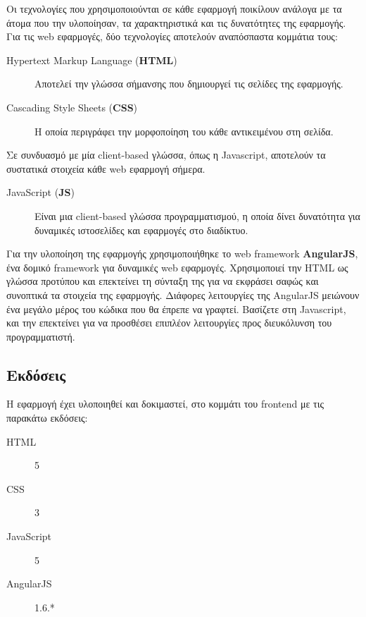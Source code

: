 Οι τεχνολογίες που χρησιμοποιούνται σε κάθε εφαρμογή ποικίλουν ανάλογα με τα άτομα που την υλοποίησαν, τα χαρακτηριστικά και τις δυνατότητες της εφαρμογής.
\newline
Για τις web εφαρμογές, δύο τεχνολογίες αποτελούν αναπόσπαστα κομμάτια τους:

\begin{description}
\item [Hypertext Markup Language (\textbf{HTML})] Αποτελεί την γλώσσα σήμανσης που δημιουργεί τις σελίδες της εφαρμογής.

\item [Cascading Style Sheets (\textbf{CSS})] Η οποία περιγράφει την μορφοποίηση του κάθε αντικειμένου στη σελίδα. 
\end{description}


Σε συνδυασμό με μία client-based γλώσσα, όπως η Javascript, αποτελούν τα συστατικά στοιχεία κάθε web εφαρμογή σήμερα.

\begin{description}
\item [JavaScript (\textbf{JS})] Είναι μια client-based γλώσσα προγραμματισμού, η οποία δίνει δυνατότητα για δυναμικές ιστοσελίδες και εφαρμογές στο διαδίκτυο.
\end{description}

Για την υλοποίηση της εφαρμογής χρησιμοποιήθηκε το web framework \textbf{AngularJS}, ένα δομικό framework για δυναμικές web εφαρμογές. Χρησιμοποιεί την HTML ως γλώσσα προτύπου και επεκτείνει τη σύνταξη της για να εκφράσει σαφώς και συνοπτικά τα στοιχεία της εφαρμογής. Διάφορες  λειτουργίες της AngularJS μειώνουν ένα μεγάλο μέρος του κώδικα που θα έπρεπε να γραφτεί. Βασίζετε στη Javascript, και την επεκτείνει για να προσθέσει επιπλέον λειτουργίες προς διευκόλυνση του προγραμματιστή.

\subsection{Εκδόσεις}

Η εφαρμογή έχει υλοποιηθεί και δοκιμαστεί, στο κομμάτι του frontend με τις παρακάτω εκδόσεις:

\begin{description}
\item [HTML] 5
\item [CSS] 3
\item [JavaScript] 5
\item [AngularJS] 1.6.*
\end{description}



